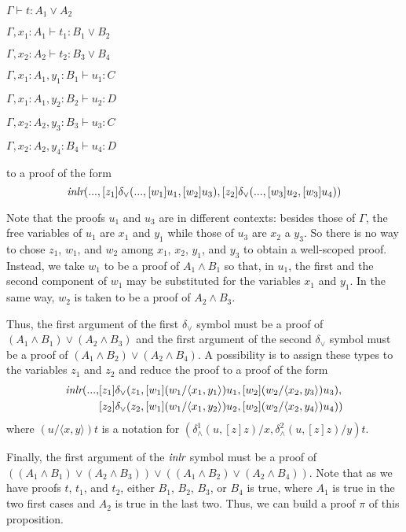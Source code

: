 \documentclass[screen, sigconf,authorversion,nonacm]{acmart}
\theoremstyle{acmdefinition}
\numberwithin{equation}{section}
\newcommand\abstr[1]{[#1]}
\newcommand\inlr{\mbox{\it inlr}}
\newcommand\elimand{\delta_{\wedge}}
\newcommand\elimor{\delta_{\vee}}
\newcommand\pair[2]{\langle #1, #2 \rangle}
\begin{document}
$\Gamma \vdash t:A_1 \vee A_2$

$\Gamma, x_1:A_1 \vdash t_1:B_1 \vee B_2$

$\Gamma, x_2:A_2 \vdash t_2:B_3 \vee B_4$

$\Gamma, x_1:A_1, y_1:B_1 \vdash u_1:C$

$\Gamma, x_1:A_1, y_2:B_2 \vdash u_2:D$

$\Gamma, x_2:A_2, y_3:B_3 \vdash u_3:C$

$\Gamma, x_2:A_2, y_4:B_4 \vdash u_4:D$

\noindent
to a proof of the form 
$$\inlr
    (..., 
     \abstr{z_1}\elimor(..., \abstr{w_1} u_1, \abstr{w_2} u_3),
     \abstr{z_2}\elimor(..., \abstr{w_3} u_2, \abstr{w_3} u_4))$$

Note that the proofs $u_1$ and $u_3$ are in different contexts:
besides those of $\Gamma$, the free variables of $u_1$ are $x_1$ and
$y_1$ while those of $u_3$ are $x_2$ a $y_3$. So there is no way to
chose $z_1$, $w_1$, and $w_2$ among $x_1$, $x_2$, $y_1$, and $y_3$ to
obtain a well-scoped proof. Instead, we take $w_1$ to be a proof of
$A_1 \wedge B_1$ so that, in $u_1$, the first and the second component
of $w_1$ may be substituted for the variables $x_1$ and $y_1$. In the
same way, $w_2$ is taken to be a proof of $A_2 \wedge B_3$.

Thus, the first argument of the first $\elimor$ symbol must be a proof
of $(A_1 \wedge B_1) \vee (A_2 \wedge B_3)$ and the first argument of
the second $\elimor$ symbol must be a proof of $(A_1 \wedge B_2) \vee
(A_2 \wedge B_4)$. A possibility is to assign these types to the
variables $z_1$ and $z_2$ and reduce the proof to a proof of the form
$$\inlr
\begin{aligned}[t]
    (
      ...,
      &
      \abstr{z_1}\elimor(z_1,
	\abstr{w_1} (w_1/\pair{x_1}{y_1})u_1, 
      \abstr{w_2} (w_2/\pair{x_2}{y_3})u_3),\\
      &
      \abstr{z_2}\elimor(z_2,
	\abstr{w_1} (w_1/\pair{x_1}{y_2})u_2, 
      \abstr{w_2} (w_2/\pair{x_2}{y_4})u_4)
    )
  \end{aligned}$$
where $(u/\pair{x}{y})t$ is a notation for
$(\elimand^1(u,\abstr{z}z)/x,
  \elimand^2(u,\abstr{z}z)/y)t$.

Finally, the first argument of the $\inlr$ symbol must be a proof of
$((A_1 \wedge B_1) \vee (A_2 \wedge B_3)) \vee ((A_1 \wedge B_2) \vee
(A_2 \wedge B_4))$. Note that as we have proofs $t$, $t_1$, and $t_2$,
either $B_1$, $B_2$, $B_3$, or $B_4$ is true, where $A_1$ is true in
the two first cases and $A_2$ is true in the last two.  Thus, we can
build a proof $\pi$ of this proposition.
\end{document}
